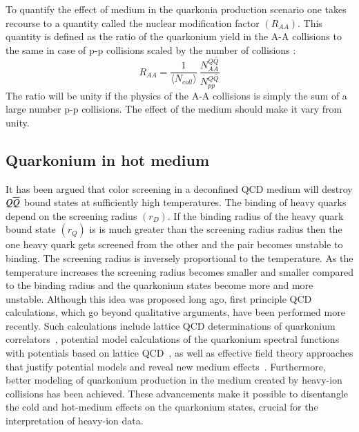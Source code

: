  To quantify the effect of medium in the quarkonia production scenario one takes recourse to a 
 quantity called the nuclear modification factor $(R_{AA})$. This quantity is defined as the ratio 
 of the quarkonium yield in the A-A collisions to the same in case of p-p collisions scaled by the 
 number of collisions : 
 \begin{equation}
 R_{AA} = \frac{1}{\langle N_{coll} \rangle} \ \frac {N^{Q{\bar Q}}_{AA}} {N^{Q{\bar Q}}_{pp}} 
 \end{equation}
 The ratio will be unity if the physics of the A-A collisions is simply the sum of a large number 
 p-p collisions. The effect of the medium should make it vary from unity. 




\subsection{Quarkonium in hot medium}
\label{sec:media_sec3}

It has been argued that color screening 
in a deconfined QCD medium will destroy $Q \overline{Q}$ bound states
at sufficiently high temperatures. The binding of heavy quarks depend on the 
screening radius $(r_D)$. If the binding radius of the heavy quark bound state 
$(r_Q)$ is is much greater than the screening radius radius then the one heavy 
quark gets screened from the other and the pair becomes unstable to binding. 
The screening radius is inversely proportional to the temperature. As the temperature 
increases the screening radius becomes smaller and smaller compared to the 
binding radius and the quarkonium states become more and more unstable. 
Although 
this idea was proposed long ago, first principle QCD calculations, 
which go beyond qualitative arguments, have been performed more recently. 
Such calculations include lattice QCD determinations of quarkonium 
correlators~\cite{Umeda:2002vr,Asakawa:2003re,Datta:2003ww,Jakovac:2006sf,Aarts:2007pk},
potential model calculations 
of the quarkonium spectral functions with potentials based on lattice 
QCD~\cite{Digal:2001ue,Wong:2004zr,Mocsy:2005qw,Mocsy:2004bv,Alberico:2006vw,Cabrera:2006wh,Mocsy:2007yj,Mocsy:2007jz},
as well as effective 
field theory approaches that justify potential models and reveal new medium 
effects~\cite{Laine:2007qy,Laine:2007gj,Laine:2008cf,Brambilla:2008cx}.  
Furthermore, better modeling of 
quarkonium production in the medium created by heavy-ion collisions has 
been achieved.   These advancements make it possible to disentangle the cold
and hot-medium effects on the quarkonium states, crucial for the 
interpretation of heavy-ion data. 



